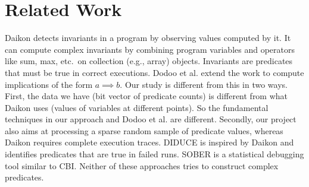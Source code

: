 
\section{Related Work}
\label{sec-rw}
Daikon \cite{ErnstPGMPTX2006} detects invariants in a program by observing values computed by it.  It can compute complex invariants by combining program variables and operators like sum, max, etc.\ on collection (e.g., array) objects.  Invariants are predicates that must be true in correct executions.  Dodoo et al. \cite{ErnstDRAFT} extend the work to compute implications of the form $a \implies b$.  Our study is different from this in two ways.  First, the data we have (bit vector of predicate counts) is different from what Daikon uses (values of variables at different points).  So the fundamental techniques in our approach and Dodoo et al. \cite{ErnstDRAFT} are different.  Secondly, our project also aims at processing a sparse random sample of predicate values, whereas Daikon requires complete execution traces.  DIDUCE \cite{581377} is inspired by Daikon and identifies predicates that are true in failed runs.  SOBER \cite{1081753} is a statistical debugging tool similar to CBI\@.  Neither of these approaches tries to construct complex predicates.

